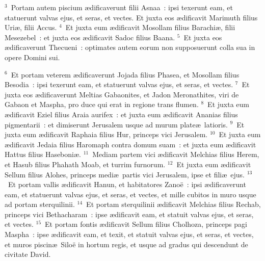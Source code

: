 ${}^{3}$~Portam autem piscium \ae dificaverunt filii Asnaa~: ipsi texerunt eam, et statuerunt valvas ejus, et seras, et vectes. Et juxta eos \ae dificavit Marimuth filius Uri\ae , filii Accus.
${}^{4}$~Et juxta eum \ae dificavit Mosollam filius Barachi\ae , filii Mesezebel~: et juxta eos \ae dificavit Sadoc filius Baana.
${}^{5}$~Et juxta eos \ae dificaverunt Thecueni~: optimates autem eorum non supposuerunt colla sua in opere Domini sui.


${}^{6}$~Et portam veterem \ae dificaverunt Jojada filius Phasea, et Mosollam filius Besodia~: ipsi texerunt eam, et statuerunt valvas ejus, et seras, et vectes.
${}^{7}$~Et juxta eos \ae dificaverunt Meltias Gabaonites, et Jadon Meronathites, viri de Gabaon et Maspha, pro duce qui erat in regione trans flumen.
${}^{8}$~Et juxta eum \ae dificavit Eziel filius Araia aurifex~: et juxta eum \ae dificavit Ananias filius pigmentarii~: et dimiserunt Jerusalem usque ad murum plate\ae\ latioris.
${}^{9}$~Et juxta eum \ae dificavit Raphaia filius Hur, princeps vici Jerusalem.
${}^{10}$~Et juxta eum \ae dificavit Jedaia filius Haromaph contra domum suam~: et juxta eum \ae dificavit Hattus filius Haseboni\ae .
${}^{11}$~Mediam partem vici \ae dificavit Melchias filius Herem, et Hasub filius Phahath Moab, et turrim furnorum.
${}^{12}$~Et juxta eum \ae dificavit Sellum filius Alohes, princeps medi\ae\ partis vici Jerusalem, ipse et fili\ae\ ejus.
${}^{13}$~Et portam vallis \ae dificavit Hanun, et habitatores Zano\"e~: ipsi \ae dificaverunt eam, et statuerunt valvas ejus, et seras, et vectes, et mille cubitos in muro usque ad portam sterquilinii.
${}^{14}$~Et portam sterquilinii \ae dificavit Melchias filius Rechab, princeps vici Bethacharam~: ipse \ae dificavit eam, et statuit valvas ejus, et seras, et vectes.
${}^{15}$~Et portam fontis \ae dificavit Sellum filius Cholhoza, princeps pagi Maspha~: ipse \ae dificavit eam, et texit, et statuit valvas ejus, et seras, et vectes, et muros piscin\ae\ Silo\"e in hortum regis, et usque ad gradus qui descendunt de civitate David.


